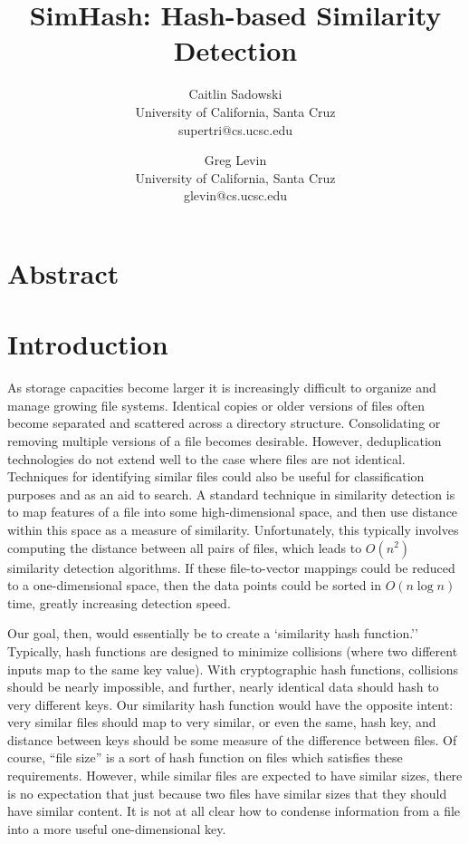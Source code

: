 \documentclass[10pt, twocolumn]{article}
\begin{document}
\title{SimHash: Hash-based Similarity Detection}

\author{Caitlin Sadowski\\
University of California, Santa Cruz\\
supertri@cs.ucsc.edu
\and
Greg Levin\\
University of California, Santa Cruz\\
glevin@cs.ucsc.edu}


\def\copyrightspace{}

\maketitle

\section{Abstract}


\section{Introduction}

As storage capacities become larger it is increasingly difficult to organize and manage growing file systems. Identical copies or older versions of files often become separated and scattered across a directory structure. Consolidating or removing multiple versions of a file becomes desirable. However, deduplication technologies do not extend well to the case where files are not identical. Techniques for identifying similar files could also be useful for classification purposes and as an aid to search.  A standard technique in similarity detection is to map features of a file into some high-dimensional space, and then use distance within this space as a measure of similarity.  Unfortunately, this typically involves computing the distance between all pairs of files, which leads to $O(n^2)$ similarity detection algorithms.  If these file-to-vector mappings could be reduced to a one-dimensional space, then the data points could be sorted in $O(n \log n)$ time, greatly increasing detection speed.

Our goal, then, would essentially be to create a `similarity hash function.''  Typically, hash functions are designed to minimize collisions (where two different inputs map to the same key value).  With cryptographic hash functions, collisions should be nearly impossible, and further, nearly identical data should hash to very different keys.  Our similarity hash function would have the opposite intent: very similar files should map to very similar, or even the same, hash key, and distance between keys should be some measure of the difference between files.  Of course, ``file size'' is a sort of hash function on files which satisfies these requirements.  However, while similar files are expected to have similar sizes, there is no expectation that just because two files have similar sizes that they should have similar content.  It is not at all clear how to condense information from a file into a more useful one-dimensional key.
\end{document}
